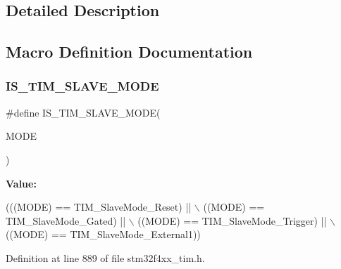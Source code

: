 \subsection{Detailed Description}


\subsection{Macro Definition Documentation}
\mbox{\label{group___t_i_m___slave___mode_ga7f0e666bc968c56df7f1f6c2465c89fb}} 
\subsubsection{\texorpdfstring{I\+S\+\_\+\+T\+I\+M\+\_\+\+S\+L\+A\+V\+E\+\_\+\+M\+O\+DE}{IS\_TIM\_SLAVE\_MODE}}
{\footnotesize\ttfamily \#define I\+S\+\_\+\+T\+I\+M\+\_\+\+S\+L\+A\+V\+E\+\_\+\+M\+O\+DE(\begin{DoxyParamCaption}\item[{}]{M\+O\+DE }\end{DoxyParamCaption})}

{\bfseries Value\+:}
\begin{DoxyCode}
(((MODE) == TIM\_SlaveMode\_Reset) || \(\backslash\)
                                 ((MODE) == TIM\_SlaveMode\_Gated) || \(\backslash\)
                                 ((MODE) == TIM\_SlaveMode\_Trigger) || \(\backslash\)
                                 ((MODE) == TIM\_SlaveMode\_External1))
\end{DoxyCode}


Definition at line 889 of file stm32f4xx\+\_\+tim.\+h.


